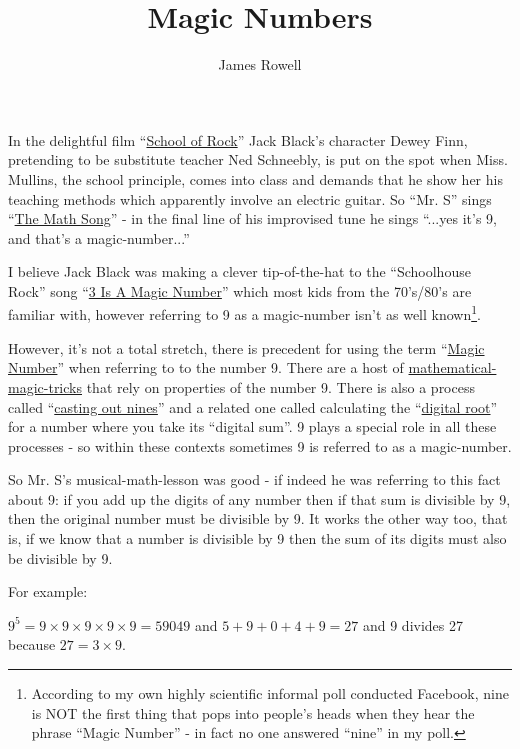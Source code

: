 \documentclass{article}
\title{Magic Numbers}
\author{James Rowell}
\newenvironment{jprIn}{\begin{adjustwidth}{2em}{}}{\end{adjustwidth}}
\begin{document}
\maketitle

In the delightful film ``\href{https://en.wikipedia.org/wiki/School_of_Rock}{School of Rock}'' Jack Black's character Dewey Finn,
pretending to be substitute teacher Ned Schneebly, is put on the spot when
Miss. Mullins, the school principle, comes into class and demands that he show
her his teaching methods which apparently involve an electric guitar.
So ``Mr. S'' sings ``\href{https://www.youtube.com/watch?v=aa8U0nL-KXg}{The Math Song}'' - in the final line of his
improvised tune he sings ``...yes it's 9, and that's a magic-number...''

I believe Jack Black was making a clever
tip-of-the-hat to the ``Schoolhouse Rock'' song ``\href{https://youtu.be/aU4pyiB-kq0}{3 Is A Magic Number}''
which most kids from the 70's/80's are familiar with, however referring to 9 as a magic-number isn't
as well known\footnote{According to my own highly scientific
informal poll conducted Facebook, %
nine is NOT the first thing that pops into people's heads when they
hear the phrase ``Magic Number'' - in fact no one answered ``nine'' in my poll.}.

However, it's not a total stretch, there is precedent for using the term ``\href{http://mathworld.wolfram.com/MagicNumber.html}{Magic Number}'' when referring to to the
number 9.
There are a host of \href{http://mathematics-in-europe.eu/?p=144}{mathematical-magic-tricks} that rely on properties of the number 9.
There is also a process called ``\href{https://en.wikipedia.org/wiki/Casting_out_nines}{casting out nines}'' and a related one 
called calculating the ``\href{http://mathworld.wolfram.com/DigitalRoot.html}{digital root}'' for a number where you take its ``digital sum''. 9
plays a special role in all these processes - so within these contexts sometimes 9
is referred to as a magic-number.

So Mr. S's musical-math-lesson was good - if indeed he was referring to this fact about 9:
if you add up the digits of
any number then if that sum is divisible by 9, then the original number
must be divisible by 9. It works the other way too, that is, if we know
that a number is divisible by 9 then the sum of its digits must also be
divisible by 9.

For example:
\begin{jprIn}
$9^5=9\times{}9\times{}9\times{}9\times{}9=59049$ and $5+9+0+4+9=27$ and 9 divides 27 because $27 = 3\times{}9$.
\end{jprIn}
\end{document}
